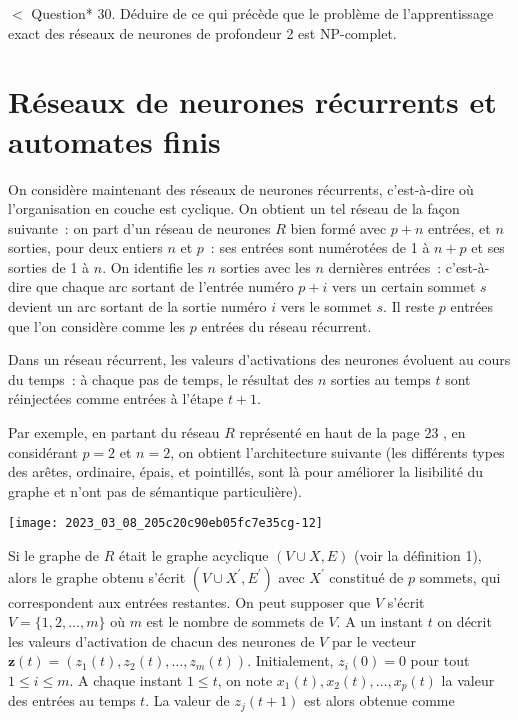 \documentclass[10pt]{article}
\begin{document}
$<$ Question* 30. Déduire de ce qui précède que le problème de l'apprentissage exact des réseaux de neurones de profondeur 2 est NP-complet.

\section{\label{sec:neurones-recurrents-automates-finis}Réseaux de neurones récurrents et automates finis}
On considère maintenant des réseaux de neurones récurrents, c'est-à-dire où l'organisation en couche est cyclique. On obtient un tel réseau de la façon suivante : on part d'un réseau de neurones $R$ bien formé avec $p+n$ entrées, et $n$ sorties, pour deux entiers $n$ et $p$ : ses entrées sont numérotées de 1 à $n+p$ et ses sorties de 1 à $n$. On identifie les $n$ sorties avec les $n$ dernières entrées : c'est-à-dire que chaque arc sortant de l'entrée numéro $p+i$ vers un certain sommet $s$ devient un arc sortant de la sortie numéro $i$ vers le sommet $s$. Il reste $p$ entrées que l'on considère comme les $p$ entrées du réseau récurrent.

Dans un réseau récurrent, les valeurs d'activations des neurones évoluent au cours du temps : à chaque pas de temps, le résultat des $n$ sorties au temps $t$ sont réinjectées comme entrées à l'étape $t+1$.

Par exemple, en partant du réseau $R$ représenté en haut de la page 23 , en considérant $p=2$ et $n=2$, on obtient l'architecture suivante (les différents types des arêtes, ordinaire, épais, et pointillés, sont là pour améliorer la lisibilité du graphe et n'ont pas de sémantique particulière).

\begin{center}
\texttt{[image: 2023\_03\_08\_205c20c90eb05fc7e35cg-12]}
\end{center}

Si le graphe de $R$ était le graphe acyclique $(V \cup X, E)$ (voir la définition 1), alors le graphe obtenu s'écrit $\left(V \cup X^{\prime}, E^{\prime}\right)$ avec $X^{\prime}$ constitué de $p$ sommets, qui correspondent aux entrées restantes. On peut supposer que $V$ s'écrit $V=\{1,2, \ldots, m\}$ où $m$ est le nombre de sommets de $V$. A un instant $t$ on décrit les valeurs d'activation de chacun des neurones de $V$ par le vecteur $\mathbf{z}(t)=\left(z_{1}(t), z_{2}(t), \ldots, z_{m}(t)\right)$. Initialement, $z_{i}(0)=0$ pour tout $1 ≤ i ≤ m$. A chaque instant $1 ≤ t$, on note $x_{1}(t), x_{2}(t), \ldots, x_{p}(t)$ la valeur des entrées au temps $t$. La valeur de $z_{j}(t+1)$ est alors obtenue comme
\end{document}
